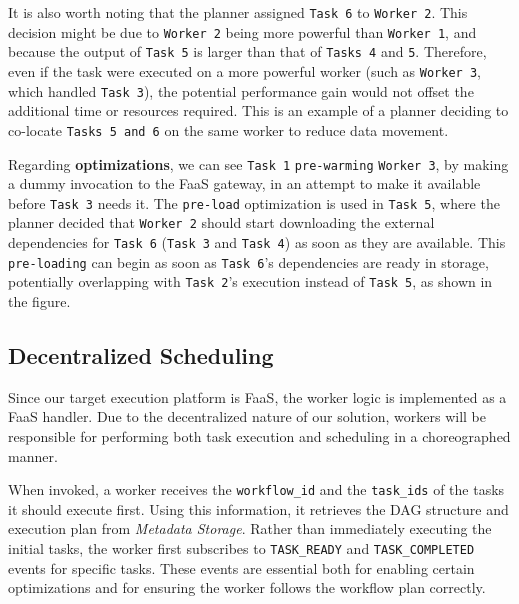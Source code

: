\documentclass[conference]{IEEEtran}
\begin{document}
It is also worth noting that the planner assigned \texttt{Task 6} to \texttt{Worker 2}. This decision might be due to \texttt{Worker 2} being more powerful than \texttt{Worker 1}, and because the output of \texttt{Task 5} is larger than that of \texttt{Tasks 4} and \texttt{5}. Therefore, even if the task were executed on a more powerful worker (such as \texttt{Worker 3}, which handled \texttt{Task 3}), the potential performance gain would not offset the additional time or resources required. This is an example of a planner deciding to co-locate \texttt{Tasks 5 and 6} on the same worker to reduce data movement.

Regarding \textbf{optimizations}, we can see \texttt{Task 1} \texttt{pre-warming} \texttt{Worker 3}, by making  a dummy invocation to the FaaS gateway, in an attempt to make it available before \texttt{Task 3} needs it. The \texttt{pre-load} optimization is used in \texttt{Task 5}, where the planner decided that \texttt{Worker 2} should start downloading the external dependencies for \texttt{Task 6} (\texttt{Task 3} and \texttt{Task 4}) as soon as they are available. This \texttt{pre-loading} can begin as soon as \texttt{Task 6}'s dependencies are ready in storage, potentially overlapping with \texttt{Task 2}'s execution instead of \texttt{Task 5}, as shown in the figure.


\subsection{Decentralized Scheduling}

Since our target execution platform is FaaS, the worker logic is implemented as a FaaS handler. Due to the decentralized nature of our solution, workers will be responsible for performing both task execution and scheduling in a choreographed manner. 

When invoked, a worker receives the \texttt{workflow\_id} and the \texttt{task\_ids} of the tasks it should execute first. Using this information, it retrieves the DAG structure and execution plan from \textit{Metadata Storage}. Rather than immediately executing the initial tasks, the worker first subscribes to \texttt{TASK\_READY} and \texttt{TASK\_COMPLETED} events for specific tasks. These events are essential both for enabling certain optimizations and for ensuring the worker follows the workflow plan correctly.
\end{document}
